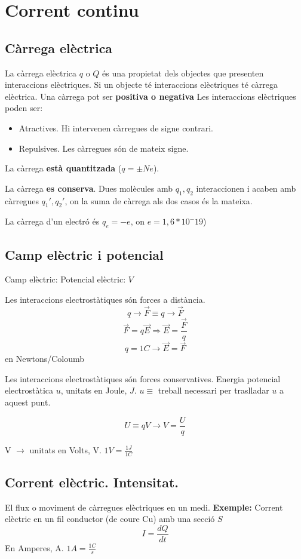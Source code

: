 \documentclass[12pt, a4paper, twoside]{report}
\begin{document}
\chapter{Corrent continu}
\section{Càrrega elèctrica}

La càrrega elèctrica \(q\) o \(Q\)  és una propietat dels objectes que presenten interaccions elèctriques.
Si un objecte té interaccions elèctriques té càrrega elèctrica.
Una càrrega pot ser \textbf{positiva o negativa}
Les interaccions elèctriques poden ser:
\begin{itemize}
    \item Atractives. Hi intervenen càrregues de signe contrari.
    \item Repulsives. Les càrregues són de mateix signe.
\end{itemize} 

La càrrega \textbf{està quantitzada} (\(q = \pm Ne\)).

La càrrega \textbf{es conserva}. Dues molècules amb \(q_1, q_2\) interaccionen i acaben amb càrregues \(q_1', q_2'\), on la suma de càrrega als dos casos és la mateixa.

La càrrega d'un electró és \(q_e = -e \), on \(e = 1,6 * 10^-19 \))

\section{Camp elèctric i potencial}
Camp elèctric: 
Potencial elèctric: \(V\) 

Les interaccions electrostàtiques són forces a distància.
$$ q \rightarrow \overrightarrow{F} \equiv q \rightarrow \overrightarrow{F} $$
$$\overrightarrow{F} =  q \overrightarrow{E} \Longrightarrow \overrightarrow{E} = \frac{\overrightarrow{F}}{q} $$
$$ q = 1C \rightarrow \overrightarrow{E} = \overrightarrow{F}$$ en Newtons/Coloumb

Les interaccions electrostàtiques són forces conservatives. 
Energia potencial electrostàtica \(u\), unitats en Joule, \(J\). 
\(u \equiv\) treball necessari per traslladar \(u\) a aquest punt. 

$$ U \equiv qV \longrightarrow V = \frac{U}{q} $$

V \(\longrightarrow\) unitats en Volts, V. \(1V = \frac{1J}{1C}\)

\section{Corrent elèctric. Intensitat.}
El flux o moviment de càrregues elèctriques en un medi. \textbf{Exemple:} Corrent elèctric en un fil conductor (de coure Cu) amb una secció \(S\)
$$I = \frac{dQ}{dt}$$
En Amperes, A. \(1A = \frac{1C}{s}\)
\end{document}

